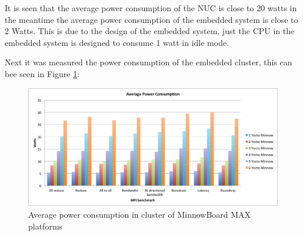 \begin{table}[]
    \centering
    \caption{Power consumption of NUC D54250WYK with MPI benchmarking}
    \label{NUC_power_1}
\end{table}


It is seen that the average power consumption of the NUC is close to 20 watts in
the meantime the average power consumption of the embedded system is close to
2 Watts. This is due to the design of the embedded system, just the CPU in the
embedded system is designed to consume 1 watt in idle mode.

Next it was measured the power consumption of the embedded cluster,
this can bee seen in Figure \ref{power_average_minnow}: 

\begin{figure}[H]
\centering
\includegraphics[width=1 \textwidth]{images/power_average.png}
\caption{Average power consumption in cluster of MinnowBoard MAX platforms}
\label{power_average_minnow}
\end{figure}

